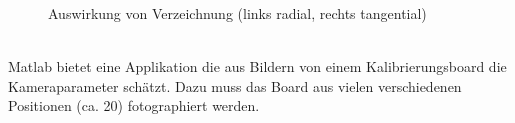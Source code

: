 \begin{figure}[ht]
\centering
    \caption{Auswirkung von Verzeichnung (links radial, rechts tangential) \cite{Verlag}}
\end{figure}
\\
Matlab bietet eine Applikation die aus Bildern von einem Kalibrierungsboard die Kameraparameter schätzt. Dazu muss das Board aus vielen verschiedenen Positionen (ca. 20) fotographiert werden. 
